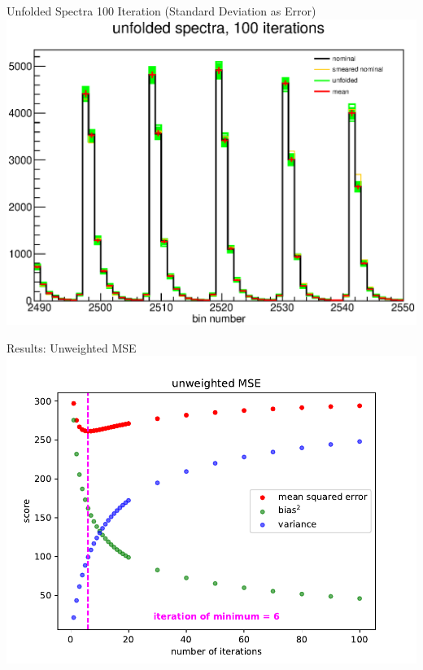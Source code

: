\documentclass[aspectratio=169]{beamer}
\begin{document}
\begin{frame}{Unfolded Spectra 100 Iteration (Standard Deviation as Error)}
  \centering
  \includegraphics[height=\textheight]{figures/unfolded_pseudo_exps_iter100.eps}
\end{frame}

\begin{frame}{Results: Unweighted MSE}
  \centering
  \includegraphics[height=\textheight]{figures/mse_vs_iter.pdf}
\end{frame}
\end{document}
